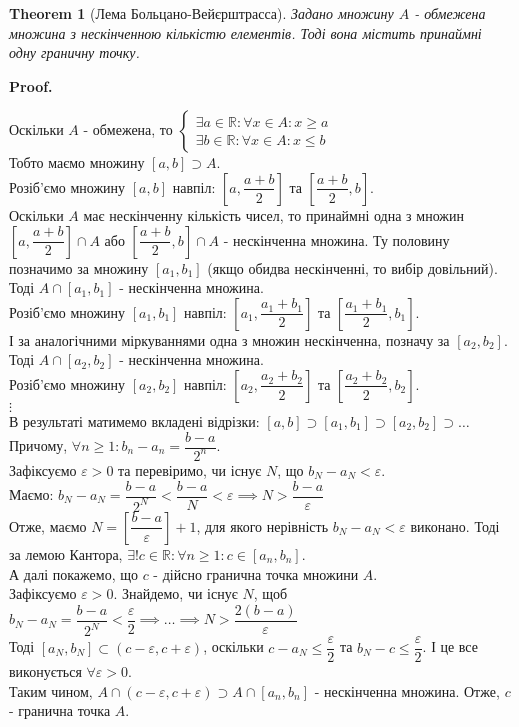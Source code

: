 \documentclass[a4paper, 14pt]{article}
\makeatletter
\def\qed{$\blacksquare$}
\theoremstyle{theoremdd}
\newtheorem{theorem}{Theorem}[subsection]
\theoremstyle{theoremdd}
\theoremstyle{theoremdd}
\theoremstyle{theoremdd}
\theoremstyle{theoremdd}
\theoremstyle{theoremdd}
\theoremstyle{theoremdd}
\theoremstyle{theoremdd}
\renewenvironment{proof}[1][Proof.\\]{\par
\pushQED{\hfill \qed}%
\normalfont \topsep6\p@\@plus6\p@\relax
\trivlist
\item\relax
{\bfseries
#1\@addpunct{.}}\hspace\labelsep\ignorespaces
}{%
\popQED\endtrivlist\@endpefalse
}
\makeatother
\begin{document}
	\begin{theorem}[Лема Больцано-Вейєрштрасса]
	Задано множину $A$ - обмежена множина з нескінченною кількістю елементів. Тоді вона містить принаймні одну граничну точку.
	\end{theorem}
	
	\begin{proof}
	Оскільки $A$ - обмежена, то
	$\begin{cases} \exists a \in \mathbb{R}: \forall x \in A: x \geq a \\
	  \exists b \in \mathbb{R}: \forall x \in A: x \leq b \end{cases}$\\
	Тобто маємо множину $[a,b] \supset A$.\\
	Розіб'ємо множину $[a,b]$ навпіл: $\left[a, \dfrac{a+b}{2}\right]$ та $\left[\dfrac{a+b}{2},b \right]$.\\
	Оскільки $A$ має нескінченну кількість чисел, то принаймні одна з множин $\left[a, \dfrac{a+b}{2}\right] \cap A$ або $\left[\dfrac{a+b}{2}, b\right] \cap A$ - нескінченна множина. Ту половину позначимо за множину $[a_1,b_1]$ (якщо обидва нескінченні, то вибір довільний). Тоді $A \cap [a_1,b_1]$ - нескінченна множина.\\
	Розіб'ємо множину $[a_1,b_1]$ навпіл: $\left[a_1, \dfrac{a_1+b_1}{2}\right]$ та $\left[\dfrac{a_1+b_1}{2},b_1 \right]$.\\
	І за аналогічними міркуваннями одна з множин нескінченна, позначу за $[a_2,b_2]$. Тоді $A \cap [a_2,b_2]$ - нескінченна множина.\\
	Розіб'ємо множину $[a_2,b_2]$ навпіл: $\left[a_2, \dfrac{a_2+b_2}{2}\right]$ та $\left[\dfrac{a_2+b_2}{2},b_2 \right]$.\\
	$\vdots$\\
	В результаті матимемо вкладені відрізки: $[a,b] \supset [a_1,b_1] \supset [a_2,b_2] \supset \dots$\\
Причому, $\forall n \geq 1: b_n - a_n = \dfrac{b-a}{2^n}$.\\
	Зафіксуємо $\varepsilon > 0$ та перевіримо, чи існує $N$, що $b_N - a_N < \varepsilon$.\\
	Маємо: $b_N - a_N = \dfrac{b-a}{2^N} < \dfrac{b-a}{N} < \varepsilon \implies N > \dfrac{b-a}{\varepsilon}$\\
	Отже, маємо $N = \left[ \dfrac{b-a}{\varepsilon} \right]+1$, для якого нерівність $b_N-a_N < \varepsilon$ виконано. Тоді за лемою Кантора, $\exists! c \in \mathbb{R}: \forall n \geq 1: c \in [a_n,b_n]$.
	\bigskip \\
	А далі покажемо, що $c$ - дійсно гранична точка множини $A$.\\
	Зафіксуємо $\varepsilon > 0$. Знайдемо, чи існує $N$, щоб $b_N - a_N = \dfrac{b-a}{2^N} < \dfrac{\varepsilon}{2} \implies \dots \implies N > \dfrac{2(b-a)}{\varepsilon}$\\
	Тоді $[a_N,b_N] \subset (c-\varepsilon, c+\varepsilon)$, оскільки $c-a_N \leq \dfrac{\varepsilon}{2}$ та $b_N -c \leq \dfrac{\varepsilon}{2}$. І це все виконується $\forall \varepsilon > 0$.\\
	Таким чином, $A \cap (c-\varepsilon, c+\varepsilon) \supset A \cap [a_n,b_n]$ - нескінченна множина. Отже, $c$ - гранична точка $A$.
	\end{proof}
	
\end{document}
